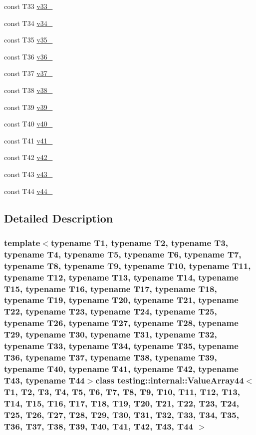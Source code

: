 \begin{DoxyCompactItemize}
\item 
const \-T33 \hyperlink{classtesting_1_1internal_1_1ValueArray44_a7a6cefe370b709c3a7b35b6d5ca8c778}{v33\-\_\-}
\item 
const \-T34 \hyperlink{classtesting_1_1internal_1_1ValueArray44_ab379e4d515d66bc57e05267515fab1d9}{v34\-\_\-}
\item 
const \-T35 \hyperlink{classtesting_1_1internal_1_1ValueArray44_a0a36112ac9b7a13572874977627ed192}{v35\-\_\-}
\item 
const \-T36 \hyperlink{classtesting_1_1internal_1_1ValueArray44_a531a52e3e8de6e982edd23c2547e4c49}{v36\-\_\-}
\item 
const \-T37 \hyperlink{classtesting_1_1internal_1_1ValueArray44_a2c4a91368c3edf933948acb4996a833d}{v37\-\_\-}
\item 
const \-T38 \hyperlink{classtesting_1_1internal_1_1ValueArray44_a364bf323d933a4adac3a9b46952ae1d3}{v38\-\_\-}
\item 
const \-T39 \hyperlink{classtesting_1_1internal_1_1ValueArray44_a0bd84ae118aa56fd251e494d1abc19fb}{v39\-\_\-}
\item 
const \-T40 \hyperlink{classtesting_1_1internal_1_1ValueArray44_ac99de9e6d59182db6141430e54f51e9c}{v40\-\_\-}
\item 
const \-T41 \hyperlink{classtesting_1_1internal_1_1ValueArray44_ad6f7550d60e8d13ade4c5033d07312e9}{v41\-\_\-}
\item 
const \-T42 \hyperlink{classtesting_1_1internal_1_1ValueArray44_a537a167baefbb86e0b3991dfd3d9437a}{v42\-\_\-}
\item 
const \-T43 \hyperlink{classtesting_1_1internal_1_1ValueArray44_a06f403913e68fabe63f09851fbdf196a}{v43\-\_\-}
\item 
const \-T44 \hyperlink{classtesting_1_1internal_1_1ValueArray44_a7fcd42ff659307eb27dce3d92c0dfd27}{v44\-\_\-}
\end{DoxyCompactItemize}


\subsection{\-Detailed \-Description}
\subsubsection*{template$<$typename T1, typename T2, typename T3, typename T4, typename T5, typename T6, typename T7, typename T8, typename T9, typename T10, typename T11, typename T12, typename T13, typename T14, typename T15, typename T16, typename T17, typename T18, typename T19, typename T20, typename T21, typename T22, typename T23, typename T24, typename T25, typename T26, typename T27, typename T28, typename T29, typename T30, typename T31, typename T32, typename T33, typename T34, typename T35, typename T36, typename T37, typename T38, typename T39, typename T40, typename T41, typename T42, typename T43, typename T44$>$class testing\-::internal\-::\-Value\-Array44$<$ T1, T2, T3, T4, T5, T6, T7, T8, T9, T10, T11, T12, T13, T14, T15, T16, T17, T18, T19, T20, T21, T22, T23, T24, T25, T26, T27, T28, T29, T30, T31, T32, T33, T34, T35, T36, T37, T38, T39, T40, T41, T42, T43, T44 $>$}




